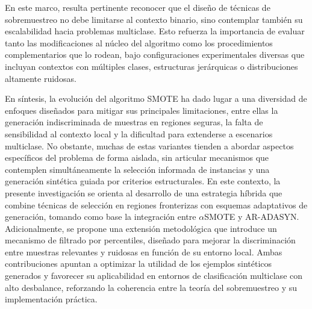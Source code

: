 \documentclass[12pt,a4paper]{article}
\begin{document}
En este marco, resulta pertinente reconocer que el diseño de técnicas de sobremuestreo no debe limitarse al contexto binario, sino contemplar también su escalabilidad hacia problemas multiclase. Esto refuerza la importancia de evaluar tanto las modificaciones al núcleo del algoritmo como los procedimientos complementarios que lo rodean, bajo configuraciones experimentales diversas que incluyan contextos con múltiples clases, estructuras jerárquicas o distribuciones altamente ruidosas.

En síntesis, la evolución del algoritmo SMOTE ha dado lugar a una diversidad de enfoques diseñados para mitigar sus principales limitaciones, entre ellas la generación indiscriminada de muestras en regiones seguras, la falta de sensibilidad al contexto local y la dificultad para extenderse a escenarios multiclase. No obstante, muchas de estas variantes tienden a abordar aspectos específicos del problema de forma aislada, sin articular mecanismos que contemplen simultáneamente la selección informada de instancias y una generación sintética guiada por criterios estructurales. En este contexto, la presente investigación se orienta al desarrollo de una estrategia híbrida que combine técnicas de selección en regiones fronterizas con esquemas adaptativos de generación, tomando como base la integración entre $ \alpha $SMOTE y AR-ADASYN. Adicionalmente, se propone una extensión metodológica que introduce un mecanismo de filtrado por percentiles, diseñado para mejorar la discriminación entre muestras relevantes y ruidosas en función de su entorno local. Ambas contribuciones apuntan a optimizar la utilidad de los ejemplos sintéticos generados y favorecer su aplicabilidad en entornos de clasificación multiclase con alto desbalance, reforzando la coherencia entre la teoría del sobremuestreo y su implementación práctica.











\end{document}
